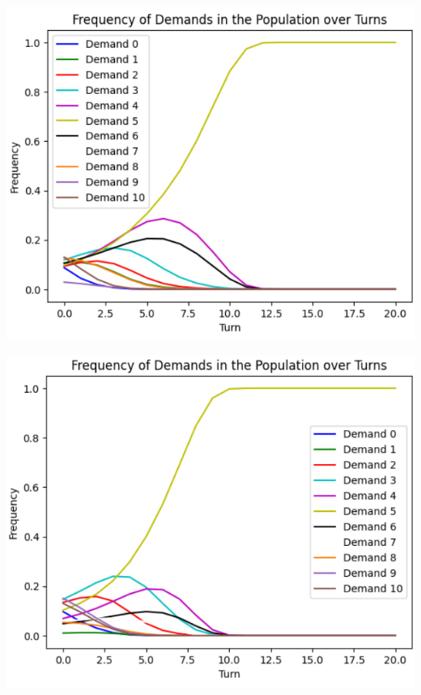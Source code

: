 \begin{center}
	\includegraphics{14}
\end{center}

\begin{center}
	\includegraphics{15}
\end{center}

